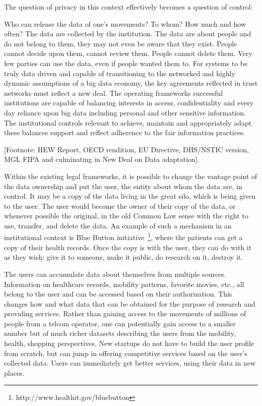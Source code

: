 The question of privacy in this context effectively becomes a question of control:

Who can release the data of one's movements?
To whom?
How much and how often?
The data are collected by the institution.
The data are about people and do not belong to them, they may not even be aware that they exist.
People cannot decide upon them, cannot review them.
People cannot delete them.
Very few parties can use the data, even if people wanted them to.
For systems to be truly data driven and capable of transitioning to the networked and highly dynamic assumptions of a big data economy, the key agreements reflected in trust networks must reflect a new deal.
The operating frameworks successful institutions are capable of balancing interests in access, confidentiality and every day reliance upon big data including personal and other sensitive information.
The institutional controls relevant to achieve, maintain and appropriately adapt these balances support and reflect adherence to the fair information practices.

[Footnote: HEW Report, OECD rendition, EU Directive, DHS/NSTIC version, MGL FIPA and culminating in New Deal on Data adaptation].

Within the existing legal frameworks, it is possible to change the vantage point of the data ownership and put the user, the entity about whom the data are, in control.
It may be a copy of the data living in the great silo, which is being given to the user.
The user would become the owner of their copy of the data, or whenever possible the original, in the old Common Law sense with the right to use, transfer, and delete the data.
An example of such a mechanism in an institutional context is Blue Button initiative~\footnote{http://www.healthit.gov/bluebutton}, where the patients can get a copy of their health records. 
Once the copy is with the user, they can do with it as they wish: give it to someone, make it public, do research on it, destroy it.

The users can accumulate data about themselves from multiple sources.
Information on healthcare records, mobility patterns, favorite movies, etc., all belong to the user and can be accessed based on their authorization.
This changes how and what data that can be obtained for the purpose of research and providing services.
Rather than gaining access to the movements of millions of people from a telcom operator, one can potentially gain access to a smaller number but of much richer datasets describing the users from the mobility, health, shopping perspectives.
New startups do not have to build the user profile from scratch, but can jump in offering competitive services based on the user's collected data.
Users can immediately get better services, using their data in new places.

